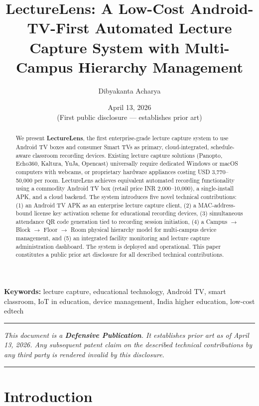 \documentclass[12pt,a4paper]{article}
\title{\textbf{LectureLens: A Low-Cost Android-TV-First Automated Lecture Capture System with Multi-Campus Hierarchy Management}}
\author[1]{Dibyakanta Acharya}
\affil[1]{D\&R AI Solutions Pvt.\ Ltd., India \\
\texttt{founder@drandsolutions.in}}
\date{April 13, 2026 \\ \small{(First public disclosure — establishes prior art)}}
\begin{document}
\maketitle

\begin{abstract}
We present \textbf{LectureLens}, the first enterprise-grade lecture capture system to use Android TV boxes and consumer Smart TVs as primary, cloud-integrated, schedule-aware classroom recording devices. Existing lecture capture solutions (Panopto, Echo360, Kaltura, YuJa, Opencast) universally require dedicated Windows or macOS computers with webcams, or proprietary hardware appliances costing USD 3{,}770--50{,}000 per room. LectureLens achieves equivalent automated recording functionality using a commodity Android TV box (retail price INR 2{,}000--10{,}000), a single-install APK, and a cloud backend. The system introduces five novel technical contributions: (1) an Android TV APK as an enterprise lecture capture client, (2) a MAC-address-bound license key activation scheme for educational recording devices, (3) simultaneous attendance QR code generation tied to recording session initiation, (4) a Campus $\rightarrow$ Block $\rightarrow$ Floor $\rightarrow$ Room physical hierarchy model for multi-campus device management, and (5) an integrated facility monitoring and lecture capture administration dashboard. The system is deployed and operational. This paper constitutes a public prior art disclosure for all described technical contributions.
\end{abstract}

\textbf{Keywords:} lecture capture, educational technology, Android TV, smart classroom, IoT in education, device management, India higher education, low-cost edtech

\hrule
\vspace{0.5em}
\small\textit{This document is a \textbf{Defensive Publication}. It establishes prior art as of April 13, 2026. Any subsequent patent claim on the described technical contributions by any third party is rendered invalid by this disclosure.}
\vspace{0.5em}
\hrule

\newpage
\tableofcontents
\newpage

\section{Introduction}
\end{document}
